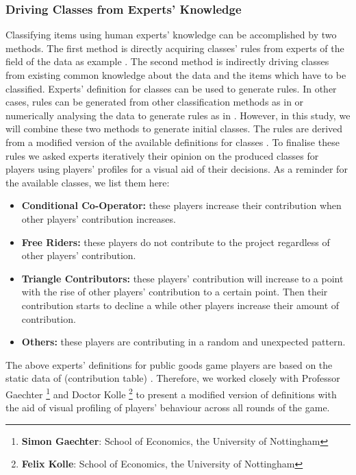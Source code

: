 \subsubsection{Driving Classes from Experts' Knowledge}
Classifying items using human experts' knowledge can be accomplished by two methods. The first method is directly acquiring classes' rules from experts of the field of the data as example \cite{Zadeh1984}. The second method is indirectly driving classes from existing common knowledge about the data and the items which have to be classified. Experts' definition for classes can be used to generate rules. In other cases, rules can be generated from other classification methods as in \cite{Lawrence2001} or numerically analysing the data to generate rules as in \cite{Sugeno1993}. However, in this study, we will combine these two methods to generate initial classes. The rules are derived from a modified version of the available definitions for classes \cite{Fischbacher2001}. To finalise these rules we asked experts iteratively their opinion on the produced classes for players using players' profiles for a visual aid of their decisions. As a reminder for the available classes, we list them here:

\begin{itemize}
    \item \textbf{Conditional Co-Operator:} these players increase their contribution when other players' contribution increases.
    \item \textbf{Free Riders:} these players do not contribute to the project regardless of other players' contribution.
    \item \textbf{Triangle Contributors:} these players' contribution will increase to a point with the rise of other players' contribution to a certain point. Then their contribution starts to decline a while other players increase their amount of contribution.
    \item \textbf{Others:} these players are contributing in a random and unexpected pattern.
\end{itemize}

The above experts' definitions for public goods game players are based on the static data of (contribution table) \cite{Fischbacher2010}. Therefore, we worked closely with 
Professor Gaechter \footnote{\textbf{Simon Gaechter}: School of Economics, the University of Nottingham} and
Doctor Kolle \footnote{\textbf{Felix Kolle}: School of Economics, the University of Nottingham}
to present a modified version of definitions with the aid of visual profiling of players' behaviour across all rounds of the game. 
  

